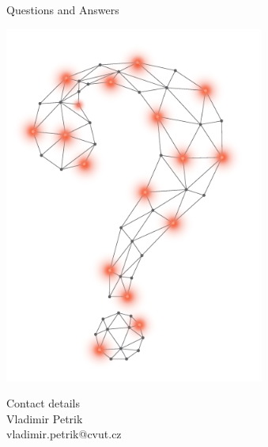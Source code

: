 \documentclass{agimusslidesschool}
\begin{document}
    \begin{frame}{Questions and Answers}
        \begin{minipage}[t]{0.5\textwidth}
            \vspace{0pt}
            \includegraphics[width=0.5\linewidth]{figs_review/question_mark}
        \end{minipage}%
        \begin{minipage}[t]{0.5\textwidth}
            \vspace{0pt}
            \flushright
            \vspace{2cm}
            \alert{\large Contact details} \\[\agimustitlesep]
            Vladimir Petrik \\
            vladimir.petrik@cvut.cz
        \end{minipage}

    \end{frame}
\end{document}
